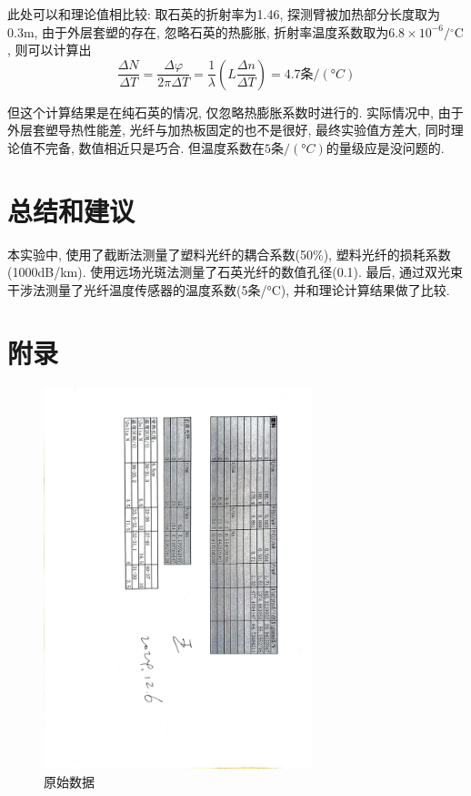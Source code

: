 \documentclass[12pt,a4paper]{article}
\begin{document}
此处可以和理论值相比较: 取石英的折射率为1.46, 探测臂被加热部分长度取为0.3m, 由于外层套塑的存在, 忽略石英的热膨胀, 
折射率温度系数取为$6.8 \times 10^{-6} /{ }^{\circ} \mathrm{C}$, 则可以计算出
\begin{equation}
    \frac{\Delta N}{\Delta T} = \frac{\Delta \varphi}{2 \pi \Delta T} = \frac{1}{\lambda}\left(L \frac{\Delta n}{\Delta T}\right) =4.7\text{条}/(°C)
 \end{equation}

但这个计算结果是在纯石英的情况, 仅忽略热膨胀系数时进行的. 实际情况中, 由于外层套塑导热性能差, 光纤与加热板固定的也不是很好, 最终实验值方差大, 同时理论值不完备, 数值相近只是巧合. 
但温度系数在$5\text{条}/(°C)$的量级应是没问题的. 
\section{总结和建议}
本实验中, 使用了截断法测量了塑料光纤的耦合系数(50\%), 塑料光纤的损耗系数(1000dB/km). 使用远场光斑法测量了石英光纤的数值孔径(0.1). 
最后, 通过双光束干涉法测量了光纤温度传感器的温度系数(5条/°C), 并和理论计算结果做了比较. 
\newpage
\section{附录}
\begin{figure}[htbp]
    \centering
    \includegraphics[width=0.7\textwidth]{raw_data.jpeg}
    \caption{原始数据}
\end{figure}
\end{document}
